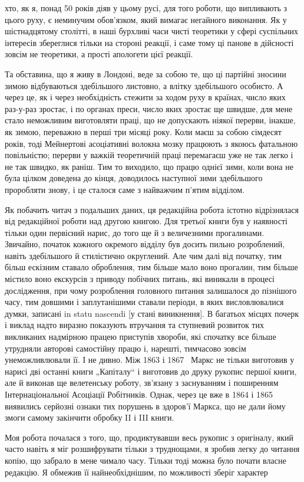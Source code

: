 \parcont{}  %
хто, як я, понад 50 років діяв у цьому русі, для того роботи,
що випливають з цього руху, є неминучим обов’язком, який
вимагає негайного виконання. Як у шістнадцятому столітті, в
наші бурхливі часи чисті теоретики у сфері суспільних інтересів
збереглися тільки на стороні реакції, і саме тому ці панове
в дійсності зовсім не теоретики, а прості апологети цієї реакції.

Та обставина, що я живу в Лондоні, веде за собою те, що
ці партійні зносини зимою відбуваються здебільшого листовно,
а влітку здебільшого особисто. А через це, як і через необхідність
стежити за ходом руху в країнах, число яких раз-у-раз
зростає, і по органах преси, число яких зростає ще швидше, для
мене стало неможливим виготовляти праці, що не допускають
ніякої перерви, інакше, як зимою, переважно в перші три місяці
року. Коли маєш за собою сімдесят років, тоді Мейнертові асоціативні
волокна мозку працюють з якоюсь фатальною повільністю;
перерви у важкій теоретичній праці перемагаєш уже не так
легко і не так швидко, як раніш. Тим то виходило, що працю
однієї зими, коли вона не була цілком доведена до кінця, доводилось
наступної зими здебільшого проробляти знову, і це сталося
саме з найважчим п’ятим відділом.

Як побачить читач з подальших даних, ця редакційна робота
істотно відрізнялася від редакційної роботи над другою книгою.
Для третьої книги був у наявності тільки один первісний нарис,
до того ще й з величезними прогалинами. Звичайно, початок
кожного окремого відділу був досить пильно розроблений,
навіть здебільшого й стилістично округлений. Але чим далі від
початку, тим більш ескізним ставало оброблення, тим більше мало
воно прогалин, тим більше містило воно екскурсів з приводу побічних
питань, які виникали в процесі дослідження, при чому розроблення
головного питання залишалося до пізнішого часу, тим
довшими і заплутанішими ставали періоди, в яких висловлювалися
думки, записані in statu nascendi [у стані виникнення].
В багатьох місцях почерк і виклад надто виразно показують
втручання та ступневий розвиток тих викликаних надмірною
працею приступів хвороби, які спочатку все більше утрудняли
авторові самостійну працю і, нарешті, тимчасово зовсім унеможливлювали
її. І не дивно. Між 1863 і 1867~ Маркс не тільки
виготовив у нарисі дві останні книги „Капіталу“ і виготовив до
друку рукопис першої книги, але й виконав ще велетенську
роботу, зв’язану з заснуванням і поширенням Інтернаціональної
Асоціації Робітників. Однак, через це вже в 1864 і 1865~
виявились серйозні ознаки тих порушень в здоров’ї Маркса, що
не дали йому змоги самому закінчити обробку II і III книги.

Моя робота почалася з того, що, продиктувавши весь рукопис
з оригіналу, який часто навіть я міг розшифрувати тільки з труднощами,
я зробив легку до читання копію, що забрало в мене
чимало часу. Тільки тоді можна було почати власне редакцію.
Я обмежив її найнеобхіднішим, по можливості зберіг характер
\parbreak{}  %
